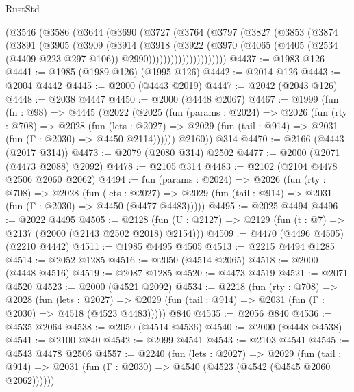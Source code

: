 \begin{lexlean}{RustStd}
\begin{coremodule}
        (@3546
          (@3586
            (@3644
              (@3690
                (@3727
                  (@3764
                    (@3797
                      (@3827
                        (@3853
                          (@3874
                            (@3891
                              (@3905
                                (@3909
                                  (@3914
                                    (@3918
                                      (@3922
                                        (@3970
                                          (@4065
                                            (@4405
                                              (@2534 (@4409 @223 @297 @106))
                                              @2990)))))))))))))))))))))
@4437 := @1983 @126
@4441 := @1985 (@1989 @126) (@1995 @126)
@4442 := @2014 @126
@4443 := @2004 @4442
@4445 := @2000 (@4443 @2019)
@4447 := @2042 (@2043 @126)
@4448 := @2038 @4447
@4450 := @2000 (@4448 @2067)
@4467 := @1999
    (fun (fn : @98) =>
    @4445
      (@2022
        (@2025
          (fun (params : @2024) =>
          @2026
            (fun (rty : @708) =>
            @2028
              (fun (lets : @2027) =>
              @2029 (fun (tail : @914) => @2031 (fun (Γ : @2030) => @4450 @2114))))))
        @2160))
    @314
@4470 := @2166 (@4443 (@2017 @314))
@4473 := @2079 (@2080 @314) @2502
@4477 := @2000 (@2071 (@4473 @2088) @2092)
@4478 := @2105 @314
@4483 := @2102 (@2104 @4478 @2506 @2060 @2062)
@4494 := fun (params : @2024) =>
  @2026
    (fun (rty : @708) =>
    @2028
      (fun (lets : @2027) =>
      @2029 (fun (tail : @914) => @2031 (fun (Γ : @2030) => @4450 (@4477 @4483)))))
@4495 := @2025 @4494
@4496 := @2022 @4495
@4505 := @2128 (fun (U : @2127) => @2129 (fun (t : @7) => @2137 (@2000 (@2143 @2502 @2018) @2154)))
@4509 := @4470 (@4496 @4505) (@2210 @4442)
@4511 := @1985 @4495 @4505
@4513 := @2215 @4494 @1285
@4514 := @2052 @1285
@4516 := @2050 (@4514 @2065)
@4518 := @2000 (@4448 @4516)
@4519 := @2087 @1285
@4520 := @4473 @4519
@4521 := @2071 @4520
@4523 := @2000 (@4521 @2092)
@4534 := @2218
    (fun (rty : @708) =>
    @2028
      (fun (lets : @2027) =>
      @2029 (fun (tail : @914) => @2031 (fun (Γ : @2030) => @4518 (@4523 @4483)))))
    @840
@4535 := @2056 @840
@4536 := @4535 @2064
@4538 := @2050 (@4514 @4536)
@4540 := @2000 (@4448 @4538)
@4541 := @2100 @840
@4542 := @2099 @4541
@4543 := @2103 @4541
@4545 := @4543 @4478 @2506
@4557 := @2240
    (fun (lets : @2027) =>
    @2029
      (fun (tail : @914) => @2031 (fun (Γ : @2030) => @4540 (@4523 (@4542 (@4545 @2060 @2062))))))

\end{coremodule}
\end{lexlean}

